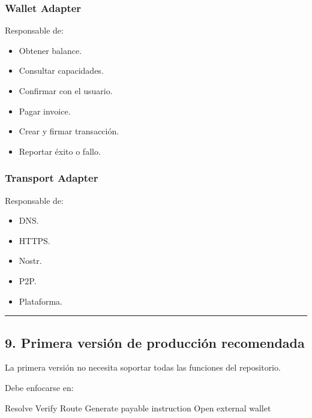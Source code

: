 \documentclass[
]{article}
\newenvironment{Shaded}{}{}
\newcommand{\NormalTok}[1]{#1}
\providecommand{\tightlist}{%
  \setlength{\itemsep}{0pt}\setlength{\parskip}{0pt}}
\begin{document}
\hypertarget{wallet-adapter}{%
\subsubsection{Wallet Adapter}\label{wallet-adapter}}

Responsable de:

\begin{itemize}
\tightlist
\item
  Obtener balance.
\item
  Consultar capacidades.
\item
  Confirmar con el usuario.
\item
  Pagar invoice.
\item
  Crear y firmar transacción.
\item
  Reportar éxito o fallo.
\end{itemize}

\hypertarget{transport-adapter}{%
\subsubsection{Transport Adapter}\label{transport-adapter}}

Responsable de:

\begin{itemize}
\tightlist
\item
  DNS.
\item
  HTTPS.
\item
  Nostr.
\item
  P2P.
\item
  Plataforma.
\end{itemize}

\begin{center}\rule{0.5\linewidth}{0.5pt}\end{center}

\hypertarget{primera-versiuxf3n-de-producciuxf3n-recomendada}{%
\subsection{9. Primera versión de producción
recomendada}\label{primera-versiuxf3n-de-producciuxf3n-recomendada}}

La primera versión no necesita soportar todas las funciones del
repositorio.

Debe enfocarse en:

\begin{Shaded}
\begin{Highlighting}[]
\NormalTok{Resolve}
\NormalTok{Verify}
\NormalTok{Route}
\NormalTok{Generate payable instruction}
\NormalTok{Open external wallet}
\end{Highlighting}
\end{Shaded}
\end{document}
